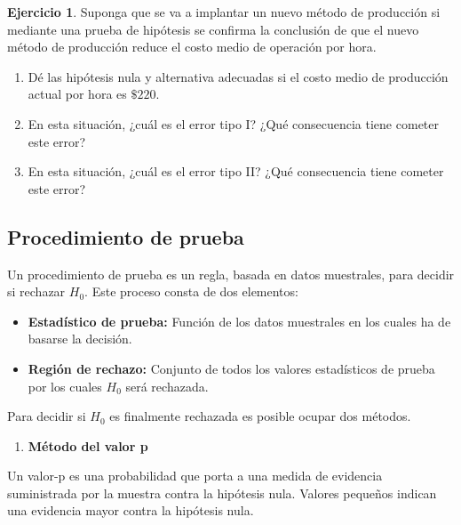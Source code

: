 \documentclass[
  11pt,
]{book}
\providecommand{\tightlist}{%
  \setlength{\itemsep}{0pt}\setlength{\parskip}{0pt}}
\theoremstyle{definition}
\theoremstyle{definition}
\theoremstyle{definition}
\newtheorem{exercise}{Ejercicio}[chapter]
\theoremstyle{definition}
\theoremstyle{remark}
\begin{document}
\begin{exercise}

Suponga que se va a implantar un nuevo método de producción si mediante una prueba de hipótesis se confirma la conclusión de que el nuevo método de producción reduce el costo medio de operación por hora.

\begin{enumerate}
\def\labelenumi{\alph{enumi}.}
\tightlist
\item
  Dé las hipótesis nula y alternativa adecuadas si el costo medio de producción actual por hora es \(\$220\).
\item
  En esta situación, ¿cuál es el error tipo I? ¿Qué consecuencia tiene cometer este error?
\item
  En esta situación, ¿cuál es el error tipo II? ¿Qué consecuencia tiene cometer este error?
\end{enumerate}

\end{exercise}

\subsection{Procedimiento de prueba}\label{prueba-de-hipotesis-procedimiento}

Un procedimiento de prueba es un regla, basada en datos muestrales, para decidir si rechazar \(H_0\). Este proceso consta de dos elementos:

\begin{itemize}
\tightlist
\item
  \textbf{Estadístico de prueba:} Función de los datos muestrales en los cuales ha de basarse la decisión.
\item
  \textbf{Región de rechazo:} Conjunto de todos los valores estadísticos de prueba por los cuales \(H_0\) será rechazada.
\end{itemize}

Para decidir si \(H_0\) es finalmente rechazada es posible ocupar dos métodos.

\begin{enumerate}
\def\labelenumi{\arabic{enumi}.}
\tightlist
\item
  \textbf{Método del valor p}
\end{enumerate}

Un valor-p es una probabilidad que porta a una medida de evidencia suministrada por la muestra contra la hipótesis nula. Valores pequeños indican una evidencia mayor contra la hipótesis nula.
\end{document}
